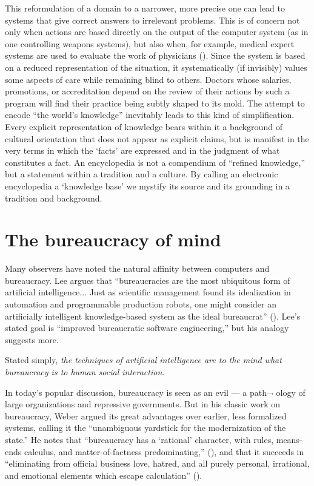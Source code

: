 \documentclass[12pt]{article}
\begin{document}
This reformulation of a domain to a narrower, more precise one can lead to systems that give correct answers to irrelevant problems. This is of concern not only when actions are based directly on the output of the computer system (as in one controlling weapons systems), but also when, for example, medical expert systems are used to evaluate the work of physicians (\cite{athanasiou1987}). Since the system is based on a reduced representation of the situation, it systematically (if invisibly) values some aspects of care while remaining blind to others.  Doctors whose salaries,
promotions, or accreditation depend on the review of their actions by
such a program will find their practice being subtly shaped to its mold. The attempt to encode ``the world's knowledge'' inevitably leads to this kind of simplification. Every explicit representation of knowledge bears within it a background of cultural orientation that does not appear as explicit claims, but is manifest in the very terms in which the `facts' are expressed and in the judgment of what constitutes a fact. An encyclopedia is not a compendium of ``refined knowledge,'' but a statement within a tradition and a culture. By calling an electronic encyclopedia a `knowledge base' we mystify its source and its grounding in a tradition and background.

\section{The bureaucracy of mind}

Many observers have noted the natural affinity between computers and bureaucracy. Lee argues that ``bureaucracies are the most ubiquitous form of artificial intelligence... Just as scientific management found its idealization in automation and programmable production robots, one might consider an artificially intelligent knowledge-based system as the ideal bureaucrat'' (\cite{lee1985}). Lee's stated goal is ``improved bureaucratic software engineering,'' but his analogy suggests more.

Stated simply, {\it the techniques of artificial intelligence are to the mind what bureaucracy is to human social interaction}.

In today's popular discussion, bureaucracy is seen as an evil --- a path¬ ology of large organizations and repressive governments. But in his classic work on bureaucracy, Weber argued its great advantages over earlier, less formalized systems, calling it the ``unambiguous yardstick for the modernization of the state.'' He notes that ``bureaucracy has a `rational' character, with rules, means-ends calculus, and matter-of-factness predominating,'' (\cite{weber1968}), and that it succeeds in ``eliminating from official business love, hatred, and all purely personal, irrational, and emotional elements which escape calculation'' (\cite{weber1968}).
\end{document}
